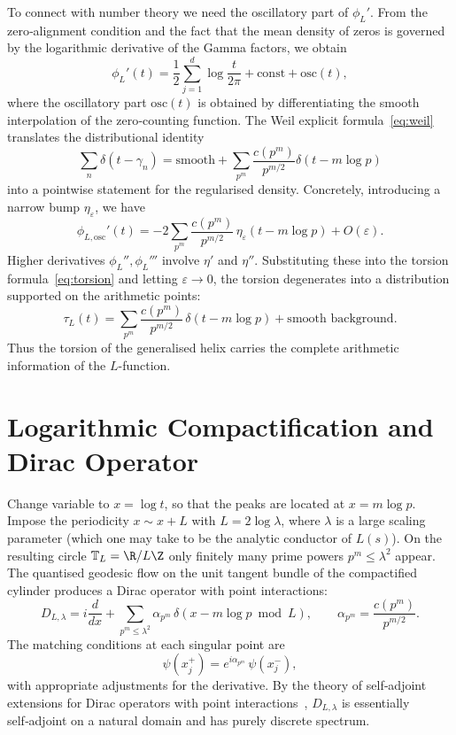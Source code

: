 \documentclass[12pt,a4paper]{article}
\begin{document}
To connect with number theory we need the oscillatory part of \(\phi_L'\). From the zero‑alignment condition and the fact that the mean density of zeros is governed by the logarithmic derivative of the Gamma factors, we obtain
\[
\phi_L'(t) = \frac12 \sum_{j=1}^d \log\frac{t}{2\pi} + \text{const} + \text{osc}(t),
\]
where the oscillatory part \(\text{osc}(t)\) is obtained by differentiating the smooth interpolation of the zero‑counting function. The Weil explicit formula~\eqref{eq:weil} translates the distributional identity
\[
\sum_n \delta(t-\gamma_n) = \text{smooth} + \sum_{p^m} \frac{c(p^m)}{p^{m/2}} \delta(t - m\log p)
\]
into a pointwise statement for the regularised density. Concretely, introducing a narrow bump \(\eta_\varepsilon\), we have
\[
\phi_{L,\mathrm{osc}}'(t) = -2\sum_{p^m} \frac{c(p^m)}{p^{m/2}}\,\eta_\varepsilon(t - m\log p) + O(\varepsilon).
\tag{3}
\]
Higher derivatives \(\phi_L'', \phi_L'''\) involve \(\eta'\) and \(\eta''\). Substituting these into the torsion formula~\eqref{eq:torsion} and letting \(\varepsilon\to0\), the torsion degenerates into a distribution supported on the arithmetic points:
\[
\tau_L(t) = \sum_{p^m} \frac{c(p^m)}{p^{m/2}}\,\delta(t - m\log p) + \text{smooth background}.
\tag{4}
\]
Thus the torsion of the generalised helix carries the complete arithmetic information of the \(L\)-function.

\section{Logarithmic Compactification and Dirac Operator}

Change variable to \(x = \log t\), so that the peaks are located at \(x = m\log p\). Impose the periodicity \(x \sim x + L\) with \(L = 2\log\lambda\), where \(\lambda\) is a large scaling parameter (which one may take to be the analytic conductor of \(L(s)\)). On the resulting circle \(\mathbb{T}_L = \R/L\Z\) only finitely many prime powers \(p^m \le \lambda^2\) appear. The quantised geodesic flow on the unit tangent bundle of the compactified cylinder produces a Dirac operator with point interactions:
\[
D_{L,\lambda} = i\frac{d}{dx} + \sum_{p^m\le \lambda^2} \alpha_{p^m}\,\delta(x - m\log p \bmod L),
\qquad \alpha_{p^m} = \frac{c(p^m)}{p^{m/2}}.
\tag{5}
\]
The matching conditions at each singular point are
\[
\psi(x_j^+) = e^{i\alpha_{p^m}}\,\psi(x_j^-),
\]
with appropriate adjustments for the derivative. By the theory of self‑adjoint extensions for Dirac operators with point interactions~\cite{Albeverio1988}, \(D_{L,\lambda}\) is essentially self‑adjoint on a natural domain and has purely discrete spectrum.
\end{document}
